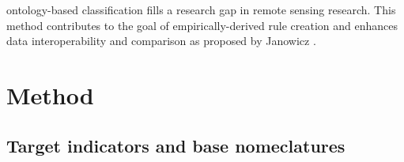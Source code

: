 \documentclass[authoryear, review,12pt,number]{elsarticle}
\begin{document}
ontology-based classification fills a research gap in remote sensing research.
This method contributes to the goal of empirically-derived rule creation and
enhances data interoperability and comparison as proposed by Janowicz 
\citep{Janowicz2012}.
 \section{Method} \subsection{Target indicators
and base nomeclatures} \label{subsec_indicators_and_nomenclatures}
\end{document}

